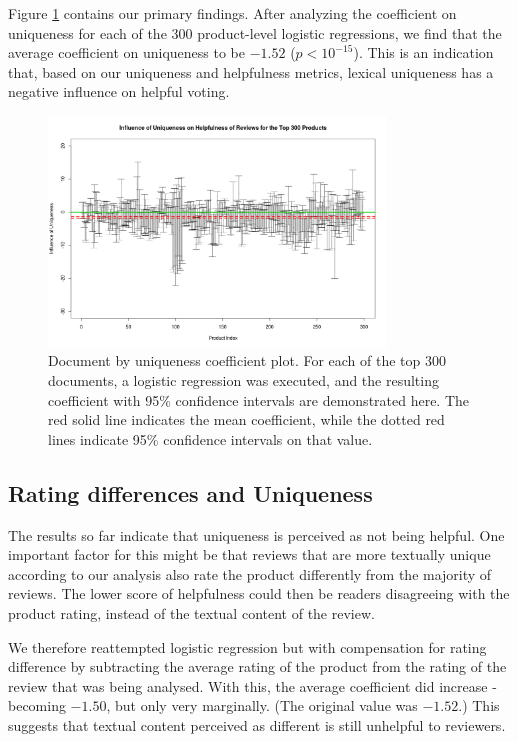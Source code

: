 \documentclass[10pt]{article}
\begin{document}
Figure \ref{fig:result} contains our primary findings. After analyzing the coefficient on uniqueness for each of the 300 product-level logistic regressions, we find that the average coefficient on uniqueness to be $-1.52$ ($p < 10^{-15}$). This is an indication that, based on our uniqueness and helpfulness metrics, lexical uniqueness has a negative influence on helpful voting. 

\begin{figure}[h!]
  \centering
  \includegraphics[width=0.8\textwidth]{influence.png}
  \caption{Document by uniqueness coefficient plot. For each of the top 300 documents, a logistic regression was executed, and the resulting coefficient with 95\% confidence intervals are demonstrated here. The red solid line indicates the mean coefficient, while the dotted red lines indicate 95\% confidence intervals on that value.}
  \label{fig:result}
\end{figure}

\subsection{Rating differences and Uniqueness}

The results so far indicate that uniqueness is perceived as not being helpful. One important factor for this might be that reviews that are more textually unique according to our analysis also rate the product differently from the majority of reviews. The lower score of helpfulness could then be readers disagreeing with the product rating, instead of the textual content of the review. 

We therefore reattempted logistic regression but with compensation for rating difference by subtracting the average rating of the product from the rating of the review that was being analysed. With this, the average coefficient did increase - becoming $-1.50$, but only very marginally. (The original value was $-1.52$.) This suggests that textual content perceived as different is still unhelpful to reviewers.
\end{document}
